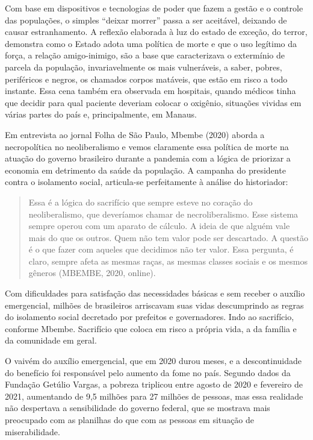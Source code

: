 Com base em dispositivos e tecnologias de poder que fazem a gestão e o
controle das populações, o simples ``deixar morrer'' passa a ser
aceitável, deixando de causar estranhamento. A reflexão elaborada à luz
do estado de exceção, do terror, demonstra como o Estado adota uma
política de morte e que o uso legítimo da força, a relação
amigo-inimigo, são a base que caracterizava o extermínio de parcela da
população, invariavelmente os mais vulneráveis, a saber, pobres,
periféricos e negros, os chamados corpos matáveis, que estão em risco a
todo instante. Essa cena também era observada em hospitais, quando
médicos tinha que decidir para qual paciente deveriam colocar o
oxigênio, situações vividas em várias partes do país e, principalmente,
em Manaus.

Em entrevista ao jornal Folha de São Paulo, Mbembe (2020) aborda a
necropolítica no neoliberalismo e vemos claramente essa política de
morte na atuação do governo brasileiro durante a pandemia com a lógica
de priorizar a economia em detrimento da saúde da população. A campanha
do presidente contra o isolamento social, articula-se perfeitamente à
análise do historiador:

\begin{quote}
Essa é a lógica do sacrifício que sempre esteve no coração do
neoliberalismo, que deveríamos chamar de necroliberalismo. Esse sistema
sempre operou com um aparato de cálculo. A ideia de que alguém vale mais
do que os outros. Quem não tem valor pode ser descartado. A questão é o
que fazer com aqueles que decidimos não ter valor. Essa pergunta, é
claro, sempre afeta as mesmas raças, as mesmas classes sociais e os
mesmos gêneros (MBEMBE, 2020, online).
\end{quote}

Com dificuldades para satisfação das necessidades básicas e sem receber
o auxílio emergencial, milhões de brasileiros arriscavam suas vidas
descumprindo as regras do isolamento social decretado por prefeitos e
governadores. Indo ao sacrifício, conforme Mbembe. Sacrifício que coloca
em risco a própria vida, a da família e da comunidade em geral.

O vaivém do auxílio emergencial, que em 2020 durou meses, e a
descontinuidade do benefício foi responsável pelo aumento da fome no
país. Segundo dados da Fundação Getúlio Vargas, a pobreza triplicou
entre agosto de 2020 e fevereiro de 2021, aumentando de 9,5 milhões para
27 milhões de pessoas, mas essa realidade não despertava a sensibilidade
do governo federal, que se mostrava mais preocupado com as planilhas do
que com as pessoas em situação de miserabilidade.

